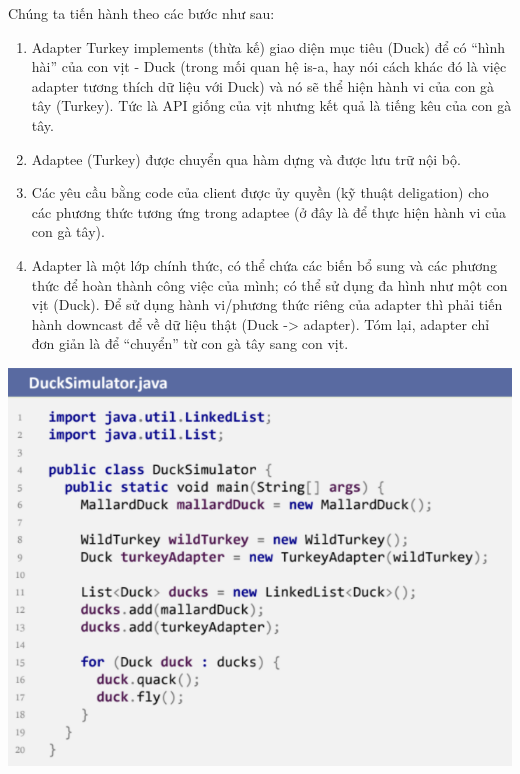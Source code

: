 Chúng ta tiến hành theo các bước như sau:
\begin{enumerate}
\item Adapter Turkey implements (thừa kế) giao diện mục tiêu (Duck) để có “hình hài” của con vịt - Duck (trong mối quan hệ is-a, hay nói cách khác đó là việc adapter tương thích dữ liệu với Duck) và nó sẽ thể hiện hành vi của con gà tây (Turkey). Tức là API giống của vịt nhưng kết quả là tiếng kêu của con gà tây.
\item Adaptee (Turkey) được chuyển qua hàm dựng và được lưu trữ nội bộ.
\item Các yêu cầu bằng code của client được ủy quyền (kỹ thuật deligation) cho các phương thức tương ứng trong adaptee (ở đây là để thực hiện hành vi của con gà tây).
\item Adapter là một lớp chính thức, có thể chứa các biến bổ sung và các phương thức để hoàn thành công việc của mình; có thể sử dụng đa hình như một con vịt (Duck). Để sử dụng hành vi/phương thức riêng của adapter thì phải tiến hành downcast để về dữ liệu thật (Duck -> adapter). Tóm lại, adapter chỉ đơn giản là để “chuyển” từ con gà tây sang con vịt.
\end{enumerate}
\begin{center}
\includegraphics{GALLEYS/images/chapter6/code4}
\end{center}

